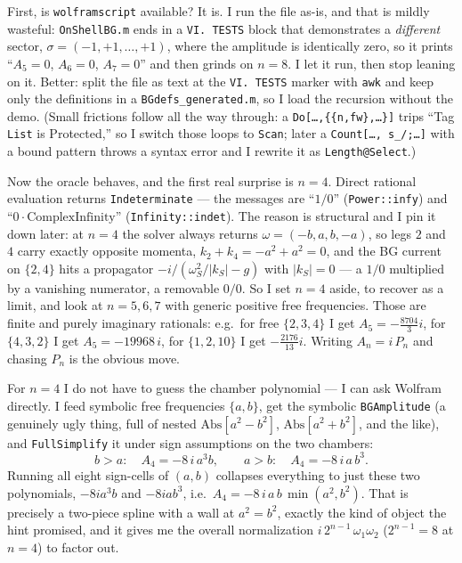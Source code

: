 \documentclass{article}
\begin{document}
First, is \texttt{wolframscript} available? It is. I run the file as-is, and that
is mildly wasteful: \texttt{OnShellBG.m} ends in a \texttt{VI.\ TESTS} block that
demonstrates a \emph{different} sector, $\sigma=(-1,+1,\dots,+1)$, where the
amplitude is identically zero, so it prints ``$A_5=0$, $A_6=0$, $A_7=0$'' and
then grinds on $n=8$. I let it run, then stop leaning on it. Better: split the
file as text at the \texttt{VI.\ TESTS} marker with \texttt{awk} and keep only the
definitions in a \texttt{BGdefs\_generated.m}, so I load the recursion without the
demo. (Small frictions follow all the way through: a
\texttt{Do[\dots,\{\{n,fw\},\dots\}]} trips ``Tag \texttt{List} is Protected,''
so I switch those loops to \texttt{Scan}; later a \texttt{Count[\dots,\,s\_/;\dots]}
with a bound pattern throws a syntax error and I rewrite it as
\texttt{Length@Select}.)

Now the oracle behaves, and the first real surprise is $n=4$. Direct rational
evaluation returns \texttt{Indeterminate} --- the messages are ``$1/0$''
(\texttt{Power::infy}) and ``$0\cdot\text{ComplexInfinity}$''
(\texttt{Infinity::indet}). The reason is structural and I pin it down later: at
$n=4$ the solver always returns $\omega=(-b,a,b,-a)$, so legs $2$ and $4$ carry
exactly opposite momenta, $k_2+k_4=-a^2+a^2=0$, and the BG current on $\{2,4\}$
hits a propagator $-i/(\omega_S^2/|k_S|-g)$ with $|k_S|=0$ --- a $1/0$ multiplied
by a vanishing numerator, a removable $0/0$. So I set $n=4$ aside, to recover as a
limit, and look at $n=5,6,7$ with generic positive free frequencies. Those are
finite and purely imaginary rationals: e.g.\ for free $\{2,3,4\}$ I get
$A_5=-\tfrac{8704}{3}i$, for $\{4,3,2\}$ I get $A_5=-19968\,i$, for $\{1,2,10\}$
I get $-\tfrac{2176}{13}i$. Writing $A_n=i\,P_n$ and chasing $P_n$ is the obvious
move.

For $n=4$ I do not have to guess the chamber polynomial --- I can ask Wolfram
directly. I feed symbolic free frequencies $\{a,b\}$, get the symbolic
\texttt{BGAmplitude} (a genuinely ugly thing, full of nested
$\mathrm{Abs}[a^2-b^2]$, $\mathrm{Abs}[a^2+b^2]$, and the like), and
\texttt{FullSimplify} it under sign assumptions on the two chambers:
\[
b>a:\quad A_4=-8\,i\,a^3 b,\qquad a>b:\quad A_4=-8\,i\,a\,b^3 .
\]
Running all eight sign-cells of $(a,b)$ collapses everything to just these two
polynomials, $-8ia^3b$ and $-8iab^3$, i.e.\
$A_4=-8\,i\,a\,b\,\min(a^2,b^2)$. That is precisely a two-piece spline with a
wall at $a^2=b^2$, exactly the kind of object the hint promised, and it gives me
the overall normalization $i\,2^{n-1}\,\omega_1\omega_2$ ($2^{n-1}=8$ at $n=4$)
to factor out.
\end{document}
